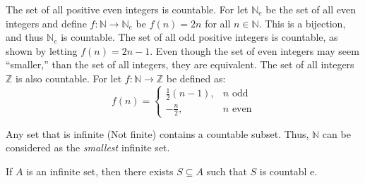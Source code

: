 \documentclass[crop=false,class=book,oneside]{standalone}
\begin{document}
            \begin{example}
                The set of all positive even integers is
                countable. For let $\mathbb{N}_{e}$ be the
                set of all even integers and define
                $f:\mathbb{N}\rightarrow\mathbb{N}_{e}$ be
                $f(n)=2n$ for all $n\in\mathbb{N}$. This is
                a bijection, and thus $\mathbb{N}_{e}$ is
                countable. The set of all odd positive integers
                is countable, as shown by letting
                $f(n)=2n-1$. Even though the set of even
                integers may seem ``smaller,'' than the set of
                all integers, they are equivalent. The set of
                all integers $\mathbb{Z}$ is also countable.
                For let $f:\mathbb{N}\rightarrow\mathbb{Z}$
                be defined as:
                \begin{equation}
                    f(n)=
                    \begin{cases}
                        \frac{1}{2}(n-1),&n\textrm{ odd}\\
                        -\frac{n}{2},&n\textrm{ even}
                    \end{cases}
                \end{equation}
            \end{example}
            Any set that is infinite (Not finite) contains a
            countable subset. Thus, $\mathbb{N}$ can be
            considered as the \textit{smallest} infinite set.
            \begin{theorem}
                If $A$ is an infinite set, then there exists
                $S\subseteq{A}$ such that $S$ is countabl e.
            \end{theorem}
\end{document}
